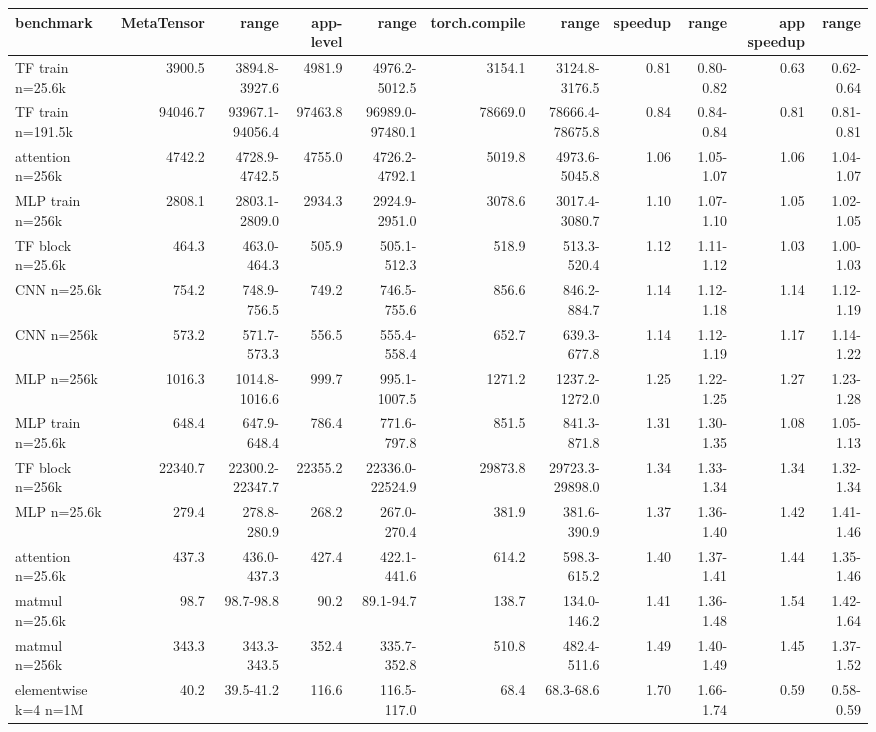 \begin{tabular}{lrrrrrrrrrr}
\toprule
benchmark & MetaTensor & range & app-level & range & torch.compile & range & speedup & range & app speedup & range \\
\midrule
TF train n=25.6k & 3900.5 & 3894.8-3927.6 & 4981.9 & 4976.2-5012.5 & 3154.1 & 3124.8-3176.5 & 0.81 & 0.80-0.82 & 0.63 & 0.62-0.64 \\
TF train n=191.5k & 94046.7 & 93967.1-94056.4 & 97463.8 & 96989.0-97480.1 & 78669.0 & 78666.4-78675.8 & 0.84 & 0.84-0.84 & 0.81 & 0.81-0.81 \\
attention n=256k & 4742.2 & 4728.9-4742.5 & 4755.0 & 4726.2-4792.1 & 5019.8 & 4973.6-5045.8 & 1.06 & 1.05-1.07 & 1.06 & 1.04-1.07 \\
MLP train n=256k & 2808.1 & 2803.1-2809.0 & 2934.3 & 2924.9-2951.0 & 3078.6 & 3017.4-3080.7 & 1.10 & 1.07-1.10 & 1.05 & 1.02-1.05 \\
TF block n=25.6k & 464.3 & 463.0-464.3 & 505.9 & 505.1-512.3 & 518.9 & 513.3-520.4 & 1.12 & 1.11-1.12 & 1.03 & 1.00-1.03 \\
CNN n=25.6k & 754.2 & 748.9-756.5 & 749.2 & 746.5-755.6 & 856.6 & 846.2-884.7 & 1.14 & 1.12-1.18 & 1.14 & 1.12-1.19 \\
CNN n=256k & 573.2 & 571.7-573.3 & 556.5 & 555.4-558.4 & 652.7 & 639.3-677.8 & 1.14 & 1.12-1.19 & 1.17 & 1.14-1.22 \\
MLP n=256k & 1016.3 & 1014.8-1016.6 & 999.7 & 995.1-1007.5 & 1271.2 & 1237.2-1272.0 & 1.25 & 1.22-1.25 & 1.27 & 1.23-1.28 \\
MLP train n=25.6k & 648.4 & 647.9-648.4 & 786.4 & 771.6-797.8 & 851.5 & 841.3-871.8 & 1.31 & 1.30-1.35 & 1.08 & 1.05-1.13 \\
TF block n=256k & 22340.7 & 22300.2-22347.7 & 22355.2 & 22336.0-22524.9 & 29873.8 & 29723.3-29898.0 & 1.34 & 1.33-1.34 & 1.34 & 1.32-1.34 \\
MLP n=25.6k & 279.4 & 278.8-280.9 & 268.2 & 267.0-270.4 & 381.9 & 381.6-390.9 & 1.37 & 1.36-1.40 & 1.42 & 1.41-1.46 \\
attention n=25.6k & 437.3 & 436.0-437.3 & 427.4 & 422.1-441.6 & 614.2 & 598.3-615.2 & 1.40 & 1.37-1.41 & 1.44 & 1.35-1.46 \\
matmul n=25.6k & 98.7 & 98.7-98.8 & 90.2 & 89.1-94.7 & 138.7 & 134.0-146.2 & 1.41 & 1.36-1.48 & 1.54 & 1.42-1.64 \\
matmul n=256k & 343.3 & 343.3-343.5 & 352.4 & 335.7-352.8 & 510.8 & 482.4-511.6 & 1.49 & 1.40-1.49 & 1.45 & 1.37-1.52 \\
elementwise k=4 n=1M & 40.2 & 39.5-41.2 & 116.6 & 116.5-117.0 & 68.4 & 68.3-68.6 & 1.70 & 1.66-1.74 & 0.59 & 0.58-0.59 \\

\end{tabular}
